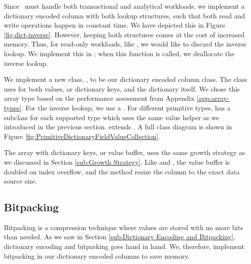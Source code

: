 Since \gap~must handle both transactional and analytical workloads, we implement a dictionary encoded column with both lookup structures, such that both read and write operations happen in constant time. We have depicted this in Figure \ref{fig:dict-inverse}. However, keeping both structures comes at the cost of increased memory. Thus, for read-only workloads, like \gd, we would like to discard the inverse lookup. We implement this in ; when this function is called, we deallocate the inverse lookup.

We implement a new class, , to be our dictionary encoded column class. The class uses  for both values, or dictionary keys, and the dictionary itself. We chose this array type based on the performance assessment from Appendix \ref{app:array-types}. For the inverse lookup, we use a . For different primitive types,  has a subclass for each supported type which uses the same value helper as we introduced in the previous section.  extends . A full class diagram is shown in Figure \ref{fig:PrimitiveDictionaryFieldValueCollection}.

The array with dictionary keys, or value buffer, uses the same growth strategy as we discussed in Section \ref{sub:Growth Strategy}. Like  and , the value buffer is doubled on index overflow, and the  method resize the column to the exact data source size.

\subsection{Bitpacking}
\label{sub:Bitpacking}

Bitpacking is a compression technique where values are stored with no more bits than needed. As we saw in Section \ref{sub:Dictionary Encoding and Bitpacking}, dictionary encoding and bitpacking goes hand in hand. We, therefore, implement bitpacking in our dictionary encoded columns to save memory.

